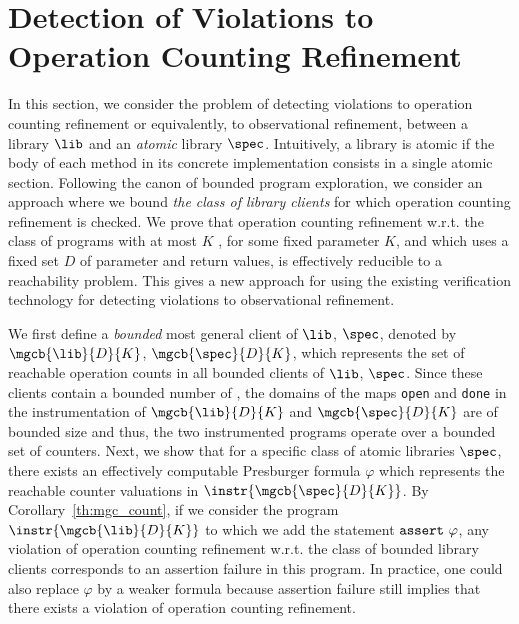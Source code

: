 \section{Detection of Violations to Operation Counting Refinement}
\label{sec:reach}

In this section, we consider the problem of detecting violations to operation counting refinement or equivalently, to observational refinement, between a library $\lib$ and an \emph{atomic} library $\spec$. Intuitively, a library is atomic if the body of each method in its concrete implementation consists in a single atomic section. 
Following the canon of bounded program exploration, we consider an approach 
where we bound \emph{the class of library clients} for which operation counting refinement is checked. We prove that operation counting refinement w.r.t. the class of programs with at most $K$ {\shwrites}, for some fixed parameter $K$, and which uses a fixed set $D$ of parameter and return values, is effectively reducible to a reachability problem. This gives a new approach for using the  existing verification technology for detecting violations to observational refinement.

We first define a \emph{bounded} most general client of $\lib$, \resp $\spec$, denoted by $\mgcb{\lib}{D}{K}$, \resp $\mgcb{\spec}{D}{K}$, which represents the set of reachable operation counts in all bounded clients of $\lib$, \resp $\spec$. Since these clients contain a bounded number of {\shwrites}, the domains of the maps {\tt open} and {\tt done} in the instrumentation of $\mgcb{\lib}{D}{K}$ and $\mgcb{\spec}{D}{K}$ are of bounded size and thus, the two instrumented programs operate over a bounded set of counters.
Next, we show that for a specific class of atomic libraries $\spec$, there exists an effectively computable Presburger formula $\varphi$ which represents the reachable counter valuations in $\instr{\mgcb{\spec}{D}{K}}$. 
By Corollary~\ref{th:mgc_count}, if we consider the program $\instr{\mgcb{\lib}{D}{K}}$ to which we add the statement ${\tt assert}\ \varphi$, any violation of operation counting refinement w.r.t. the class of bounded library clients corresponds to  an assertion failure in this program.
In practice, one could also replace $\varphi$ by a weaker formula because assertion failure still implies that there exists a violation of operation counting refinement.

